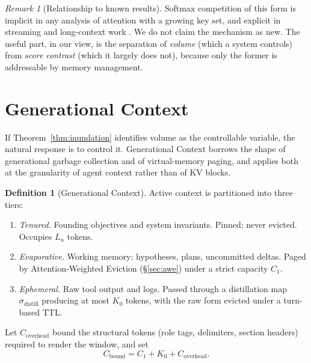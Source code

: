 ﻿\documentclass[11pt,a4paper]{article}
\theoremstyle{plain}
\theoremstyle{definition}
\newtheorem{definition}{Definition}
\theoremstyle{remark}
\newtheorem{remark}{Remark}
\begin{document}
\begin{remark}[Relationship to known results]
Softmax competition of this form is implicit in any analysis of attention with a
growing key set, and explicit in streaming and long-context work
\cite{xiao2023streamingllm,liu2023lost}. We do not claim the mechanism as new.
The useful part, in our view, is the separation of \emph{volume} (which a system
controls) from \emph{score contrast} (which it largely does not), because only
the former is addressable by memory management.
\end{remark}

\section{Generational Context}
\label{sec:gc}

If Theorem~\ref{thm:inundation} identifies volume as the controllable variable,
the natural response is to control it. Generational Context borrows the shape of
generational garbage collection and of virtual-memory paging, and applies both
at the granularity of agent context rather than of KV blocks.

\begin{definition}[Generational Context]
\label{def:gc}
Active context is partitioned into three tiers:
\begin{enumerate}[label=\textbf{Gen-\arabic*}, leftmargin=*]
  \item \emph{Tenured.} Founding objectives and system invariants. Pinned;
        never evicted. Occupies $L_u$ tokens.
  \item \emph{Evaporative.} Working memory: hypotheses, plans, uncommitted
        deltas. Paged by Attention-Weighted Eviction (\S\ref{sec:awe}) under a
        strict capacity $C_1$.
  \item \emph{Ephemeral.} Raw tool output and logs. Passed through a
        distillation map $\sigma_{\mathrm{distill}}$ producing at most $K_0$
        tokens, with the raw form evicted under a turn-based TTL.
\end{enumerate}
Let $C_{\mathrm{overhead}}$ bound the structural tokens (role tags, delimiters,
section headers) required to render the window, and set
\begin{equation}
  C_{\mathrm{bound}} = C_1 + K_0 + C_{\mathrm{overhead}} .
\end{equation}
\end{definition}
\end{document}
